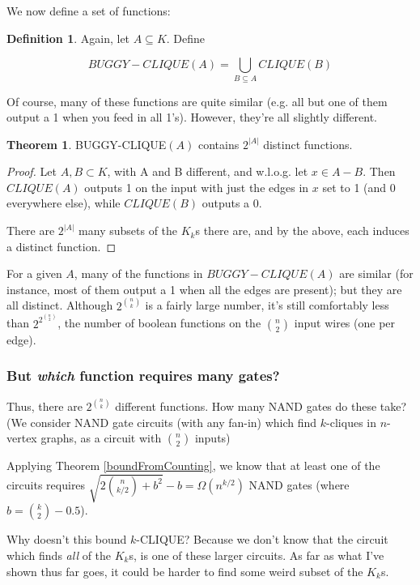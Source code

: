 \documentclass[12pt]{article}
\theoremstyle{definition}
\newtheorem{thm}{Theorem}[section]
\newtheorem{defn}{Definition}[section]
\begin{document}
We now define a set of functions:

\begin{defn}
\label{BUGGY-CLIQUE}
Again, let $A \subseteq K$. Define

\[
BUGGY-CLIQUE(A) = \bigcup_{B \subseteq A} CLIQUE(B)
\]
\end{defn}



Of course, many of these functions are quite similar (e.g. all but one of them
output a 1 when you feed in all 1's). However, they're all slightly different.

\begin{thm}
\label{buggyDistinct}
BUGGY-CLIQUE$(A)$ contains $2^{|A|}$ distinct functions.
\end{thm}
\begin{proof}

Let $A,B \subset K$, with A and B different, and w.l.o.g.
let $x \in A-B$. Then $CLIQUE(A)$ outputs 1 on the input
with just the edges in $x$ set to 1 (and 0 everywhere else),
while $CLIQUE(B)$ outputs a 0.

There are $2^{|A|}$ many subsets of the $K_k$s there are,
and by the above, each induces a distinct function.
\end{proof}

For a given $A$, many of the functions in $BUGGY-CLIQUE(A)$
are similar (for instance, most
of them output a 1 when all the edges are present);
but they are all distinct.
Although $2^{n \choose k}$ is a fairly large number,
it's still comfortably less than $2^{2^{n \choose 2}}$, the number of boolean
functions on the ${n \choose 2}$ input wires (one per edge).

\subsubsection{But {\em which} function requires many gates?}

Thus, there are $2^{n \choose k}$ different functions. 
How many NAND gates do these take?
(We consider NAND gate circuits (with any fan-in) which find $k$-cliques in $n$-vertex
graphs, as a circuit with $n \choose 2$ inputs)

Applying Theorem
\ref{boundFromCounting}, we know that at least one of the circuits requires
${\sqrt {2 {n \choose {k/2}} + b^2}} - b = \Omega(n^{k/2})$ 
NAND gates (where $b = {k \choose 2} - 0.5$).

Why doesn't this bound $k$-CLIQUE?
Because we don't know that the circuit which finds {\em all} of the
$K_k$s, is one of these larger circuits. As far as what I've
shown thus far goes, it could be harder to find some weird subset of the $K_k$s.
\end{document}
